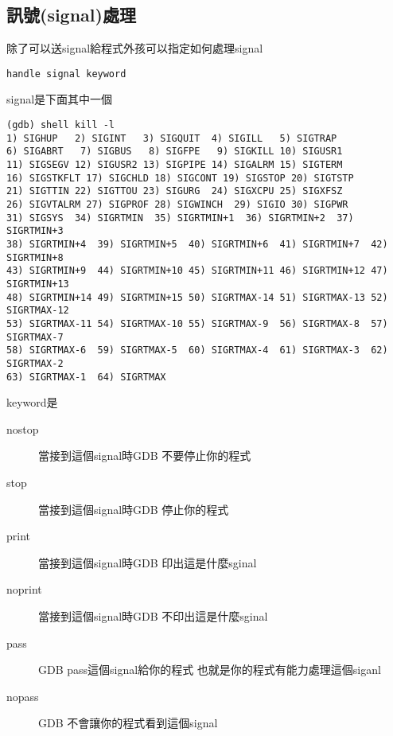   \subsection{訊號(signal)處理}
  除了可以送signal給程式外孩可以指定如何處理signal
	
  \begin{verbatim}
handle signal keyword
  \end{verbatim}
  signal是下面其中一個
  {\small \begin{verbatim}
(gdb) shell kill -l
1) SIGHUP   2) SIGINT   3) SIGQUIT  4) SIGILL   5) SIGTRAP
6) SIGABRT   7) SIGBUS   8) SIGFPE   9) SIGKILL 10) SIGUSR1
11) SIGSEGV 12) SIGUSR2 13) SIGPIPE 14) SIGALRM 15) SIGTERM
16) SIGSTKFLT 17) SIGCHLD 18) SIGCONT 19) SIGSTOP 20) SIGTSTP
21) SIGTTIN 22) SIGTTOU 23) SIGURG  24) SIGXCPU 25) SIGXFSZ
26) SIGVTALRM 27) SIGPROF 28) SIGWINCH  29) SIGIO 30) SIGPWR
31) SIGSYS  34) SIGRTMIN  35) SIGRTMIN+1  36) SIGRTMIN+2  37) SIGRTMIN+3
38) SIGRTMIN+4  39) SIGRTMIN+5  40) SIGRTMIN+6  41) SIGRTMIN+7  42) SIGRTMIN+8
43) SIGRTMIN+9  44) SIGRTMIN+10 45) SIGRTMIN+11 46) SIGRTMIN+12 47) SIGRTMIN+13
48) SIGRTMIN+14 49) SIGRTMIN+15 50) SIGRTMAX-14 51) SIGRTMAX-13 52) SIGRTMAX-12
53) SIGRTMAX-11 54) SIGRTMAX-10 55) SIGRTMAX-9  56) SIGRTMAX-8  57) SIGRTMAX-7
58) SIGRTMAX-6  59) SIGRTMAX-5  60) SIGRTMAX-4  61) SIGRTMAX-3  62) SIGRTMAX-2
63) SIGRTMAX-1  64) SIGRTMAX  
\end{verbatim}
}
    keyword是
  \begin{description}
    \item [nostop] 當接到這個signal時GDB 不要停止你的程式
    \item [stop] 當接到這個signal時GDB 停止你的程式
    \item [print] 當接到這個signal時GDB 印出這是什麼sginal
    \item [noprint] 當接到這個signal時GDB 不印出這是什麼sginal
    \item [pass] GDB pass這個signal給你的程式 也就是你的程式有能力處理這個siganl
    \item [nopass] GDB 不會讓你的程式看到這個signal
  \end{description}
	

